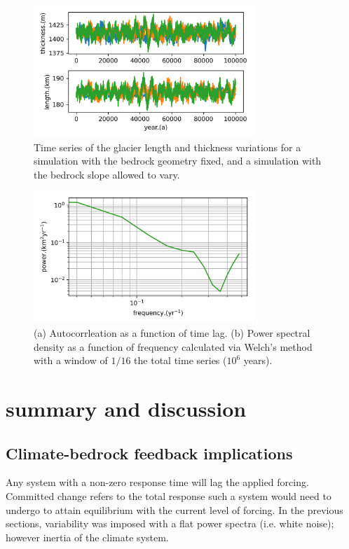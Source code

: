 \documentclass[tc, manuscript]{copernicus}
\begin{document}
\begin{figure}[t]
\includegraphics[width=8.3cm]{../figures/simulation0101.png}
\caption{Time series of the glacier length and thickness variations for a simulation with the bedrock geometry fixed, and a simulation with the bedrock slope allowed to vary.}
\end{figure}


\begin{figure}[t]
\includegraphics[width=8.3cm]{../figures/simulation0203.png}
\caption{(a) Autocorrleation as a function of time lag. (b) Power spectral density as a function of frequency calculated via Welch's method with a window of $1/16$ the total time series ($10^6$ years).}
\end{figure}

\section{summary and discussion}

\subsection{Climate-bedrock feedback implications}
Any system with a non-zero response time will lag the applied forcing.
Committed change refers to the total response such a system would need to undergo to attain equilibrium with the current level of forcing.
In the previous sections, variability was imposed with a flat power spectra (i.e. white noise); however inertia of the climate system.
\end{document}
